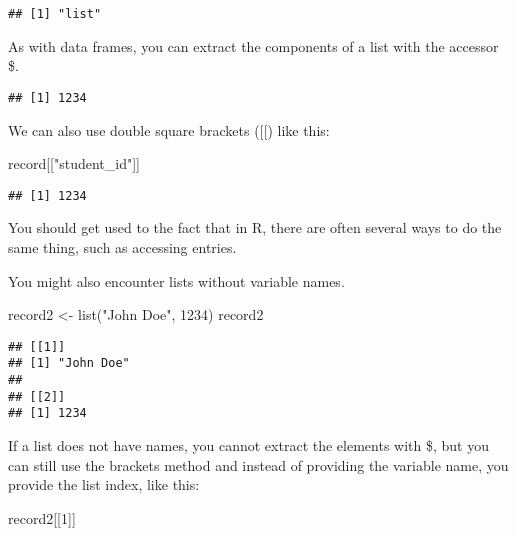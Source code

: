 \documentclass[
]{article}
\newenvironment{Shaded}{\begin{snugshade}}{\end{snugshade}}
\newcommand{\DecValTok}[1]{\textcolor[rgb]{0.00,0.00,0.81}{#1}}
\newcommand{\FunctionTok}[1]{\textcolor[rgb]{0.00,0.00,0.00}{#1}}
\newcommand{\NormalTok}[1]{#1}
\newcommand{\OtherTok}[1]{\textcolor[rgb]{0.56,0.35,0.01}{#1}}
\newcommand{\SpecialCharTok}[1]{\textcolor[rgb]{0.00,0.00,0.00}{#1}}
\newcommand{\StringTok}[1]{\textcolor[rgb]{0.31,0.60,0.02}{#1}}
\begin{document}
\begin{verbatim}
## [1] "list"
\end{verbatim}

As with data frames, you can extract the components of a list with the
accessor \$.

\begin{Shaded}
\end{Shaded}

\begin{verbatim}
## [1] 1234
\end{verbatim}

We can also use double square brackets ({[}{[}) like this:

\begin{Shaded}
\begin{Highlighting}[]
\NormalTok{record[[}\StringTok{"student\_id"}\NormalTok{]]}
\end{Highlighting}
\end{Shaded}

\begin{verbatim}
## [1] 1234
\end{verbatim}

You should get used to the fact that in R, there are often several ways
to do the same thing, such as accessing entries.

You might also encounter lists without variable names.

\begin{Shaded}
\begin{Highlighting}[]
\NormalTok{record2 }\OtherTok{\textless{}{-}} \FunctionTok{list}\NormalTok{(}\StringTok{"John Doe"}\NormalTok{, }\DecValTok{1234}\NormalTok{)}
\NormalTok{record2}
\end{Highlighting}
\end{Shaded}

\begin{verbatim}
## [[1]]
## [1] "John Doe"
## 
## [[2]]
## [1] 1234
\end{verbatim}

If a list does not have names, you cannot extract the elements with \$,
but you can still use the brackets method and instead of providing the
variable name, you provide the list index, like this:

\begin{Shaded}
\begin{Highlighting}[]
\NormalTok{record2[[}\DecValTok{1}\NormalTok{]]}
\end{Highlighting}
\end{Shaded}
\end{document}
